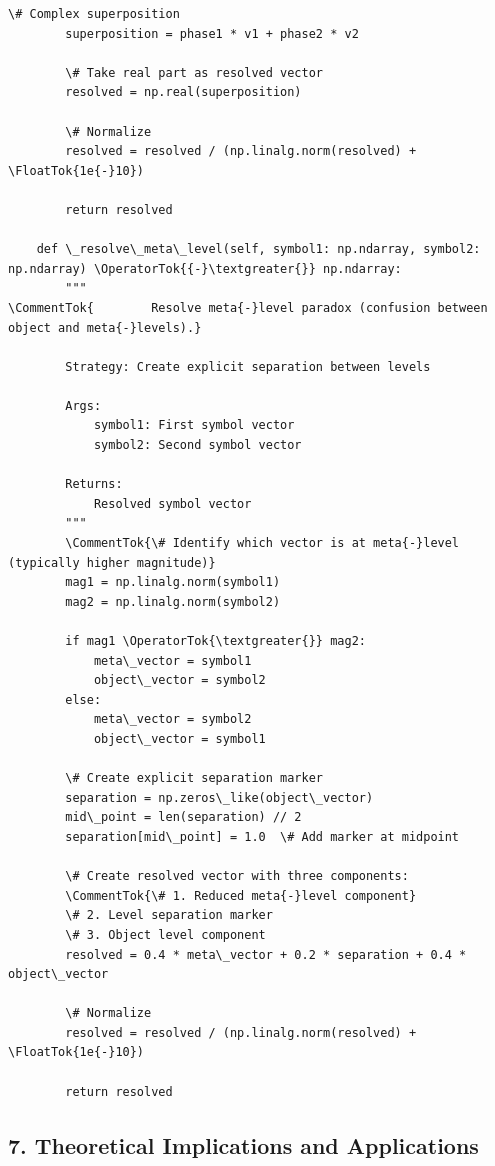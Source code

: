\documentclass[12pt]{article}
\begin{document}
\begin{lstlisting}[basicstyle=\ttfamily\small]
        \# Complex superposition
        superposition = phase1 * v1 + phase2 * v2
        
        \# Take real part as resolved vector
        resolved = np.real(superposition)
        
        \# Normalize
        resolved = resolved / (np.linalg.norm(resolved) + \FloatTok{1e{-}10})
        
        return resolved
    
    def \_resolve\_meta\_level(self, symbol1: np.ndarray, symbol2: np.ndarray) \OperatorTok{{-}\textgreater{}} np.ndarray:
        """
\CommentTok{        Resolve meta{-}level paradox (confusion between object and meta{-}levels).}
        
        Strategy: Create explicit separation between levels
        
        Args:
            symbol1: First symbol vector
            symbol2: Second symbol vector
            
        Returns:
            Resolved symbol vector
        """
        \CommentTok{\# Identify which vector is at meta{-}level (typically higher magnitude)}
        mag1 = np.linalg.norm(symbol1)
        mag2 = np.linalg.norm(symbol2)
        
        if mag1 \OperatorTok{\textgreater{}} mag2:
            meta\_vector = symbol1
            object\_vector = symbol2
        else:
            meta\_vector = symbol2
            object\_vector = symbol1
        
        \# Create explicit separation marker
        separation = np.zeros\_like(object\_vector)
        mid\_point = len(separation) // 2
        separation[mid\_point] = 1.0  \# Add marker at midpoint
        
        \# Create resolved vector with three components:
        \CommentTok{\# 1. Reduced meta{-}level component}
        \# 2. Level separation marker
        \# 3. Object level component
        resolved = 0.4 * meta\_vector + 0.2 * separation + 0.4 * object\_vector
        
        \# Normalize
        resolved = resolved / (np.linalg.norm(resolved) + \FloatTok{1e{-}10})
        
        return resolved
\end{lstlisting}

\subsection{7. Theoretical Implications and
Applications}\label{theoretical-implications-and-applications}
\end{document}
